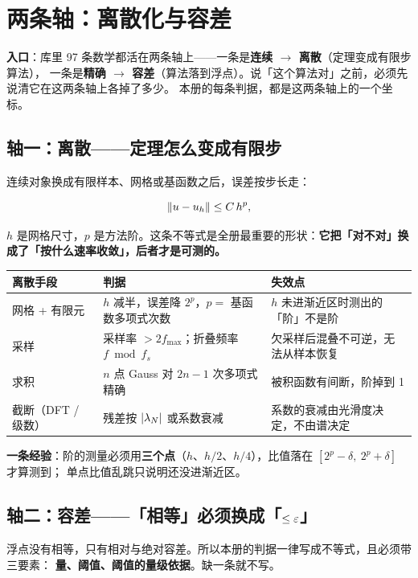 \section{两条轴：离散化与容差}

\noindent\textbf{入口}：库里 97 条数学都活在两条轴上——一条是\textbf{连续 $\to$ 离散}（定理变成有限步算法），
一条是\textbf{精确 $\to$ 容差}（算法落到浮点）。说「这个算法对」之前，必须先说清它在这两条轴上各掉了多少。
本册的每条判据，都是这两条轴上的一个坐标。

\subsection{轴一：离散——定理怎么变成有限步}

连续对象换成有限样本、网格或基函数之后，误差按步长走：

\[
\left\lVert u-u_h\right\rVert\le C\,h^{p},
\]

$h$ 是网格尺寸，$p$ 是方法阶。这条不等式是全册最重要的形状：\textbf{它把「对不对」换成了「按什么速率收敛」，后者才是可测的。}

\begin{center}
\begin{tabular}{L{3.4cm}L{5.2cm}L{6.2cm}}
\toprule
离散手段 & 判据 & 失效点 \\
\midrule
网格 + 有限元 & $h$ 减半，误差降 $2^{p}$，$p=$ 基函数多项式次数 & $h$ 未进渐近区时测出的「阶」不是阶 \\
采样 & 采样率 $>2f_{\max}$；折叠频率 $f \bmod f_s$ & 欠采样后混叠不可逆，无法从样本恢复 \\
求积 & $n$ 点 Gauss 对 $2n-1$ 次多项式精确 & 被积函数有间断，阶掉到 1 \\
截断（DFT / 级数） & 残差按 $\left\lvert \lambda_N\right\rvert$ 或系数衰减 & 系数的衰减由光滑度决定，不由谱决定 \\
\bottomrule
\end{tabular}
\end{center}

\noindent\textbf{一条经验}：阶的测量必须用\textbf{三个点}（$h$、$h/2$、$h/4$），比值落在 $[2^{p}-\delta,\ 2^{p}+\delta]$ 才算测到；
单点比值乱跳只说明还没进渐近区。

\subsection{轴二：容差——「相等」必须换成「$\le \varepsilon$」}

浮点没有相等，只有相对与绝对容差。所以本册的判据一律写成不等式，且必须带三要素：
\textbf{量、阈值、阈值的量级依据}。缺一条就不写。

